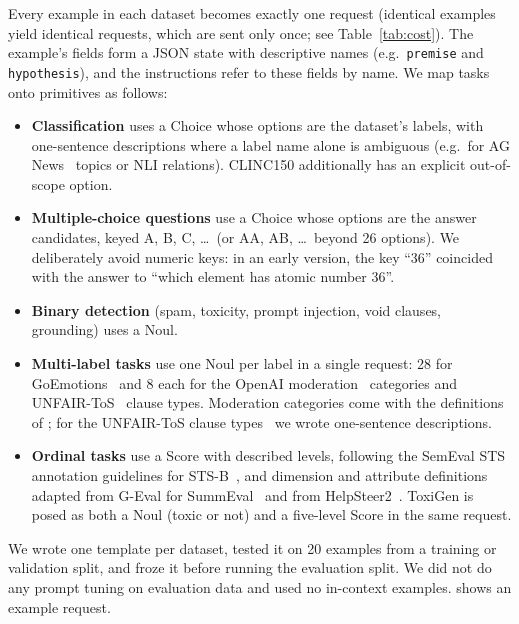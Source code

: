 \documentclass[table]{article}
\begin{document}
Every example in each dataset becomes exactly one request (identical examples yield identical requests, which are sent only once; see Table~\ref{tab:cost}). The example's fields form a JSON state with descriptive names (e.g.\ \texttt{premise} and \texttt{hypothesis}), and the instructions refer to these fields by name. We map tasks onto primitives as follows:
\begin{itemize}[leftmargin=*,noitemsep]
    \item \textbf{Classification} uses a Choice whose options are the dataset's labels, with one-sentence descriptions where a label name alone is ambiguous (e.g.\ for AG News~\cite{zhang2015character} topics or NLI relations). CLINC150 additionally has an explicit out-of-scope option.
    \item \textbf{Multiple-choice questions} use a Choice whose options are the answer candidates, keyed A, B, C, \ldots\ (or AA, AB, \ldots\ beyond 26 options). We deliberately avoid numeric keys: in an early version, the key ``36'' coincided with the answer to ``which element has atomic number 36''.
    \item \textbf{Binary detection} (spam, toxicity, prompt injection, void clauses, grounding) uses a Noul.
    \item \textbf{Multi-label tasks} use one Noul per label in a single request: 28 for GoEmotions~\cite{demszky-etal-2020-goemotions} and 8 each for the OpenAI moderation~\cite{markov2023holistic} categories and UNFAIR-ToS~\cite{chalkidis-etal-2021-lexglue} clause types. Moderation categories come with the definitions of \cite{markov2023holistic}; for the UNFAIR-ToS clause types~\cite{chalkidis-etal-2021-lexglue} we wrote one-sentence descriptions.
    \item \textbf{Ordinal tasks} use a Score with described levels, following the SemEval STS annotation guidelines for STS-B~\cite{cer-etal-2017-semeval}, and dimension and attribute definitions adapted from G-Eval for SummEval~\cite{liu-etal-2023-g} and from HelpSteer2~\cite{wang2024helpsteer2}. ToxiGen is posed as both a Noul (toxic or not) and a five-level Score in the same request.
\end{itemize}
We wrote one template per dataset, tested it on 20 examples from a training or validation split, and froze it before running the evaluation split. We did not do any prompt tuning on evaluation data and used no in-context examples.  shows an example request.
\end{document}

